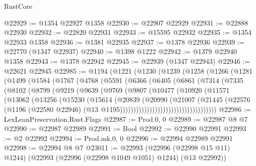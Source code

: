 \begin{lexlean}{RustCore}
\begin{coremodule}
@22929 := @1354 @22927 @1358
@22930 := @22907 @22929
@22931 := @22888 @22930
@22932 := @22820 @22931
@22933 := @15595 @22932
@22935 := @1354 @22933 @1358
@22936 := @1381 @22935
@22937 := @1378 @22936
@22939 := @22770 (@1347 @22937)
@22940 := @1398 @1222
@22942 := @1379 @22940 @1358
@22943 := @1378 @22942
@22945 := @22939 (@1347 @22943)
@22946 := @22621 @22945
@22985 := @1194
    (@1221
      (@1230
        (@1239
          (@1258
            (@1266
              (@1281
                (@1499
                  (@1584
                    (@1767
                      (@4768
                        (@5591
                          (@6366
                            (@6405
                              (@6861
                                (@7314
                                  (@7335
                                    (@8102
                                      (@8799
                                        (@9219
                                          (@9639
                                            (@9769
                                              (@9807
                                                (@10477
                                                  (@10920
                                                    (@11571
                                                      (@13062
                                                        (@13256
                                                          (@15230
                                                            (@15614
                                                              (@20839
                                                                (@20990
                                                                  (@21007
                                                                    (@21445
                                                                      (@22576
                                                                        (@1196
                                                                          (@22580 @22946)
                                                                          (@13
                                                                            @1195))))))))))))))))))))))))))))))))))))
@22986 := LexLeanPreservation.Rust.Flags
@22987 := Prod.{0, 0}
@22989 := @22987 @8 @7
@22990 := @22987 @22989
@22991 := Bool
@22992 := @22990 @22991
@22993 := @2 @22992
@22994 := Prod.mk.{0, 0}
@22996 := @22994 @22989 @22991
@22998 := @22994 @8 @7
@23011 := @22993
    (@22996 (@22998 @15 @11) @1244)
    (@22993 (@22996 (@22998 @1049 @1051) @1244) (@13 @22992))

\end{coremodule}
\end{lexlean}
